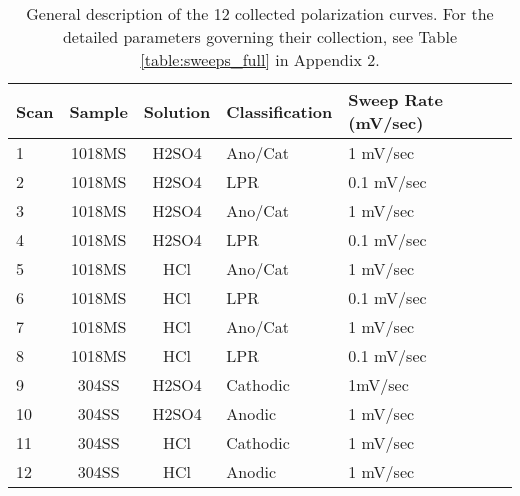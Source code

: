 \begin{table}[h!]
	\centering
	\begin{tabular}{lccp{2.5cm}p{2.5cm}p{6cm}}
	\toprule
	Scan & Sample & Solution & Classification & Sweep Rate (mV/sec) \\
	\midrule
	1 & 1018MS & H2SO4 & Ano/Cat & 1 mV/sec \\
	2 & 1018MS & H2SO4 & LPR & 0.1 mV/sec \\
	3 & 1018MS & H2SO4 & Ano/Cat & 1 mV/sec  \\
	4 & 1018MS & H2SO4 & LPR & 0.1 mV/sec  \\
	5 & 1018MS & HCl & Ano/Cat & 1 mV/sec  \\
	6 & 1018MS & HCl & LPR & 0.1 mV/sec  \\
	7 & 1018MS & HCl & Ano/Cat & 1 mV/sec  \\
	8 & 1018MS & HCl & LPR & 0.1 mV/sec \\
	9 & 304SS & H2SO4 & Cathodic & 1mV/sec \\
	10 & 304SS & H2SO4 & Anodic & 1 mV/sec  \\
	11 & 304SS & HCl & Cathodic & 1 mV/sec  \\
	12 & 304SS & HCl & Anodic & 1 mV/sec  \\
	\bottomrule
	\end{tabular}
	\caption{General description of the 12 collected polarization curves.  For the detailed parameters governing their collection, see Table \ref{table:sweeps_full} in Appendix 2.}
	\label{table:sweeps}
\end{table}
